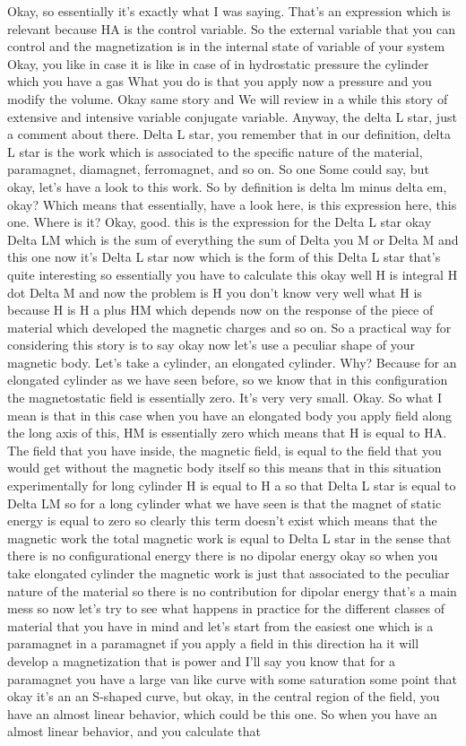 Okay, so essentially it's exactly what I was saying. That's an expression which is relevant because HA is the control variable. So the external variable that you can control and the magnetization is in the internal state of variable of your system Okay, you like in case it is like in case of in hydrostatic pressure the cylinder which you have a gas What you do is that you apply now a pressure and you modify the volume. Okay same story and We will review in a while this story of extensive and intensive variable conjugate variable. Anyway, the delta L star, just a comment about there. Delta L star, you remember that in our definition, delta L star is the work which is associated to the specific nature of the material, paramagnet, diamagnet, ferromagnet, and so on. So one Some could say, but okay, let's have a look to this work. So by definition is delta lm minus delta em, okay? Which means that essentially, have a look here, is this expression here, this one. Where is it? Okay, good. this is the expression for the Delta L star okay Delta LM which is the sum of everything the sum of Delta you M or Delta M and this one now it's Delta L star now which is the form of this Delta L star that's quite interesting so essentially you have to calculate this okay well H is integral H dot Delta M and now the problem is H you don't know very well what H is because H is H a plus HM which depends now on the response of the piece of material which developed the magnetic charges and so on. So a practical way for considering this story is to say okay now let's use a peculiar shape of your magnetic body. Let's take a cylinder, an elongated cylinder. Why? Because for an elongated cylinder as we have seen before, so we know that in this configuration the magnetostatic field is essentially zero. It's very very small. Okay. So what I mean is that in this case when you have an elongated body you apply field along the long axis of this, HM is essentially zero which means that H is equal to HA. The field that you have inside, the magnetic field, is equal to the field that you would get without the magnetic body itself so this means that in this situation experimentally for long cylinder H is equal to H a so that Delta L star is equal to Delta LM so for a long cylinder what we have seen is that the magnet of static energy is equal to zero so clearly this term doesn't exist which means that the magnetic work the total magnetic work is equal to Delta L star in the sense that there is no configurational energy there is no dipolar energy okay so when you take elongated cylinder the magnetic work is just that associated to the peculiar nature of the material so there is no contribution for dipolar energy that's a main mess so now let's try to see what happens in practice for the different classes of material that you have in mind and let's start from the easiest one which is a paramagnet in a paramagnet if you apply a field in this direction ha it will develop a magnetization that is power and I'll say you know that for a paramagnet you have a large van like curve with some saturation some point that okay it's an an S-shaped curve, but okay, in the central region of the field, you have an almost linear behavior, which could be this one. So when you have an almost linear behavior, and you calculate that 